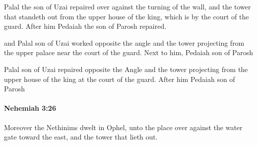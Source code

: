 			\begin{versebox}
					\item[BHS] 
					\item[LXX] 
					\item[ASV] Palal the son of Uzai repaired over against the turning of the wall, and the tower that standeth out from the upper house of the king, which is by the court of the guard. After him Pedaiah the son of Parosh repaired.
					\item[NIV] and Palal son of Uzai worked opposite the angle and the tower projecting from the upper palace near the court of the guard. Next to him, Pedaiah son of Parosh
					\item[NRSV] Palal son of Uzai repaired opposite the Angle and the tower projecting from the upper house of the king at the court of the guard. After him Pedaiah son of Parosh
			\end{versebox}

		\paragraph{Nehemiah 3:26} %
			\label{NEHEMIAH-3-26}

			Moreover the Nethinims dwelt in Ophel, unto the place over against the water gate toward the east, and the tower that lieth out.

